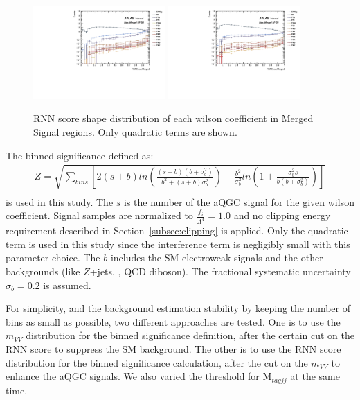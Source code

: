 \begin{figure}[]
    \centering
   \includegraphics[width=0.45\textwidth]{figures/aQGC/RNNScoreMerged_SR_HP_aQGC.pdf}
   \includegraphics[width=0.45\textwidth]{figures/aQGC/RNNScoreMerged_SR_LP_aQGC.pdf}
    \caption{RNN score shape distribution of each wilson coefficient in Merged Signal regions. Only quadratic terms are shown.}
    \label{fig:2lepaQGCshapeRNN}
\end{figure}

The binned significance defined as:
%
\begin{eqnarray*}
  Z = \sqrt{\sum_{bins}\left[2(s + b)ln\left(\frac{(s + b)(b+\sigma^2_{b})}{b^2+(s+b)\sigma^2_{b}}\right) - \frac{b^2}{\sigma^2_{b}}ln\left(1+\frac{\sigma^2_{b}s}{b(b+\sigma^2_{b})}\right)\right]} \\
\end{eqnarray*}
%
is used in this study.
The $s$ is the number of the aQGC signal for the given wilson coefficient.
Signal samples are normalized to $\frac{f_{i}}{\Lambda^4}=1.0$ and no clipping energy requirement described in Section~\ref{subsec:clipping} is applied. Only the quadratic term is used in this study since the interference term is negligibly small with this parameter choice.
The $b$ includes the SM electroweak signals and the other backgrounds (like $Z$+jets, \ttbar, QCD diboson).
The fractional systematic uncertainty $\sigma_{b} = 0.2$ is assumed.

For simplicity, and the background estimation stability by keeping the number of bins as small as possible, two different approaches are tested.
One is to use the $m_{VV}$ distribution for the binned significance definition, after the certain cut on the RNN score to suppress the SM background.
The other is to use the RNN score distribution for the binned significance calculation, after the cut on the $m_{VV}$ to enhance the aQGC signals.
We also varied the threshold for $\mathrm{M}_{tagjj}$ at the same time.

